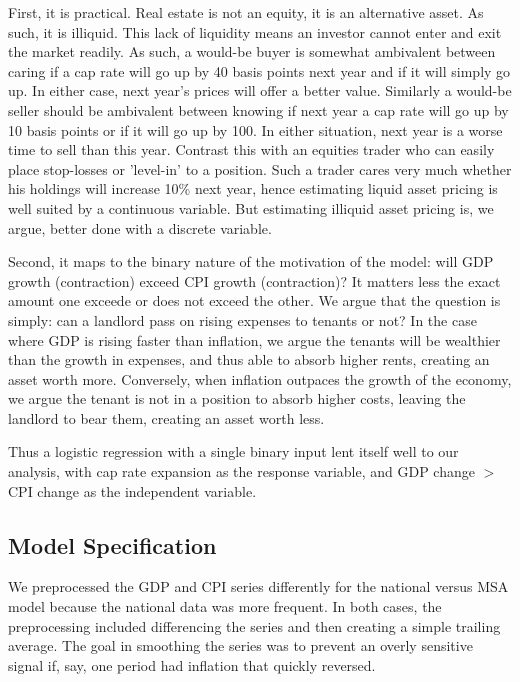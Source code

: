 First, it is practical. Real estate is not an equity, it is an alternative asset. As such, it is illiquid. This lack of liquidity means an investor cannot enter and exit the market readily. As such, a would-be buyer is somewhat ambivalent between caring if a cap rate will go up by 40 basis points next year and if it  will simply go up. In either case, next year's prices will offer a better value. Similarly a would-be seller should be ambivalent between knowing if next year a cap rate will go up by 10 basis points or if it will go up by 100. In either situation, next year is a worse time to sell than this year.  Contrast this with an equities trader who can easily place stop-losses or 'level-in' to a position. Such a trader cares very much whether his holdings will increase 10\% next year, hence estimating liquid asset pricing is well suited by a continuous variable. But estimating illiquid asset pricing is, we argue, better done with a discrete variable. 

Second, it maps to the binary nature of the motivation of the model: will GDP growth (contraction) exceed CPI growth (contraction)? It matters less the exact amount one exceede or does not exceed the other. We argue that the question is simply: can a landlord pass on rising expenses to tenants or not? In the case where GDP is rising faster than inflation, we argue the tenants will be wealthier than the growth in expenses, and thus able to absorb higher rents, creating an asset worth more. Conversely, when inflation outpaces the growth of the economy, we argue the tenant is not in a position to absorb higher costs, leaving the landlord to bear them, creating an asset worth less. 

Thus a logistic regression with a single binary input lent itself well to our analysis, with cap rate expansion as the response variable, and GDP change $ > $  CPI change as the independent variable. 

\subsection{Model Specification}

We preprocessed the GDP and CPI series differently for the national versus MSA model because the national data was more frequent. In both cases, the preprocessing included differencing the series and then creating a simple trailing average. The goal in smoothing the series was to prevent an overly sensitive signal if, say, one period had inflation that quickly reversed. 

